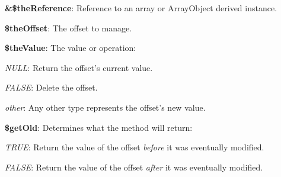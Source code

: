\begin{DoxyItemize}
\item {\bfseries \&\$the\-Reference}\-: Reference to an array or Array\-Object derived instance. 
\item {\bfseries \$the\-Offset}\-: The offset to manage. 
\item {\bfseries \$the\-Value}\-: The value or operation\-: 
\begin{DoxyItemize}
\item {\itshape N\-U\-L\-L}\-: Return the offset's current value. 
\item {\itshape F\-A\-L\-S\-E}\-: Delete the offset. 
\item {\itshape other}\-: Any other type represents the offset's new value. 
\end{DoxyItemize}
\item {\bfseries \$get\-Old}\-: Determines what the method will return\-: 
\begin{DoxyItemize}
\item {\itshape T\-R\-U\-E}\-: Return the value of the offset {\itshape before} it was eventually modified. 
\item {\itshape F\-A\-L\-S\-E}\-: Return the value of the offset {\itshape after} it was eventually modified. 
\end{DoxyItemize}
\end{DoxyItemize}


